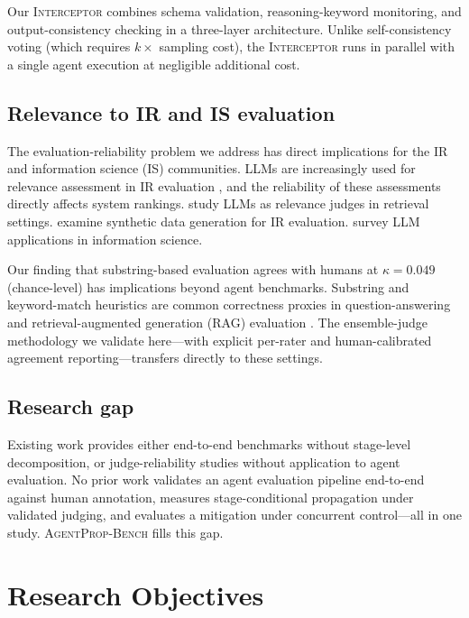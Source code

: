 \documentclass[preprint,review,12pt,3p]{elsarticle}
\newcommand{\bench}{\textsc{AgentProp-Bench}\xspace}
\newcommand{\interceptor}{\textsc{Interceptor}\xspace}
\begin{document}
Our \interceptor{} combines schema validation, reasoning-keyword
monitoring, and output-consistency checking in a three-layer architecture.
Unlike self-consistency voting (which requires $k\times$ sampling cost),
the \interceptor{} runs in parallel with a single agent execution at
negligible additional cost.

\subsection{Relevance to IR and IS evaluation}

The evaluation-reliability problem we address has direct implications
for the IR and information science (IS) communities.
LLMs are increasingly used for relevance assessment in IR evaluation
\citep{balog2025rankers}, and the reliability of these
assessments directly affects system rankings.
\citet{salemi2024retrieval} study LLMs as relevance judges in retrieval
settings.
\citet{rahmani2024synthetic} examine synthetic data generation for IR
evaluation.
\citet{zhu2024llmir} survey LLM applications in information science.

Our finding that substring-based evaluation agrees with humans at
$\kappa{=}0.049$ (chance-level) has implications beyond agent
benchmarks.
Substring and keyword-match heuristics are common correctness proxies in
question-answering and retrieval-augmented generation (RAG) evaluation
\citep{es2024ragas,niu2024ragtruth}.
The ensemble-judge methodology we validate here---with explicit
per-rater and human-calibrated agreement reporting---transfers directly
to these settings.

\subsection{Research gap}

Existing work provides either end-to-end benchmarks without stage-level
decomposition, or judge-reliability studies without application to agent
evaluation.
No prior work validates an agent evaluation pipeline end-to-end against
human annotation, measures stage-conditional propagation under validated
judging, and evaluates a mitigation under concurrent control---all in
one study.
\bench{} fills this gap.


\section{Research Objectives}
\label{sec:ro}
\end{document}
